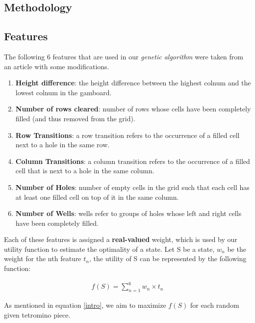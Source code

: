 \documentclass{article} %
\begin{document}
\begin{multicols}{2}
\section{Methodology}
\subsection{Features} \label{features}
The following 6 features that are used in our \textsl{genetic algorithm} were taken from an article\cite{citefeatures} with some modifications.
\begin{enumerate}
  \item \textbf{Height difference}: the height difference between the highest colnum and the lowest colnum in the gamboard.
  \item \textbf{Number of rows cleared}: number of rows whose cells have been completely filled (and thus removed from the grid).
  \item \textbf{Row Transitions}: a row transition refers to the occurrence of a filled cell next to a hole in the same row.
  \item \textbf{Column Transitions}: a column transition refers to the occurrence of a filled cell that is next to a hole in the same column.
  \item \textbf{Number of Holes}: number of empty cells in the grid such that each cell has at least one filled cell on top of it in the same column.
  \item \textbf{Number of Wells}: wells refer to groups of holes whose left and right cells have been completely filled.
\end{enumerate}
Each of these features is assigned a \textbf{real-valued} weight, which is used by our utility function to estimate the optimality of a state. Let S be a state, $w_n$ be the weight for the nth feature $t_n$, the utility of S can be represented by the following function:

\begin{ceqn}
\begin{align} \label{eq:1}
f(S) = \sum _{n=1}^{6} w_n \times t_n
\end{align}
\end{ceqn}

As mentioned in equation \ref{intro}, we aim to maximize $f(S)$ for each random given tetromino piece.



\end{multicols}
\end{document}
